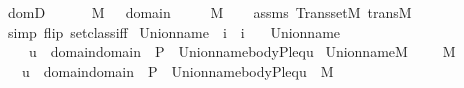 \begin{isabellebody}
%
\isadelimproof
\isanewline
%
\endisadelimproof
\isanewline
\isanewline
{}\isamarkupfalse%
\ domD\ {\isacharcolon}{\kern0pt}\isanewline
\ \ \ {\isachardoublequoteopen}{\isasymtau}\ {\isasymin}\ M{\isachardoublequoteclose}\ {\isachardoublequoteopen}{\isasymsigma}\ {\isasymin}\ domain{\isacharparenleft}{\kern0pt}{\isasymtau}{\isacharparenright}{\kern0pt}{\isachardoublequoteclose}\isanewline
\ \ \ {\isachardoublequoteopen}{\isasymsigma}\ {\isasymin}\ M{\isachardoublequoteclose}\isanewline
%
\isadelimproof
\ \ %
\endisadelimproof
%
\isatagproof
{}\isamarkupfalse%
\ assms\ Transset{\isacharunderscore}{\kern0pt}M\ trans{\isacharunderscore}{\kern0pt}M\isanewline
\ \ \isamarkupfalse%
\ {\isacharparenleft}{\kern0pt}simp\ flip{\isacharcolon}{\kern0pt}\ setclass{\isacharunderscore}{\kern0pt}iff{\isacharparenright}{\kern0pt}%
\endisatagproof
{\isafoldproof}%
%
\isadelimproof
\isanewline
%
\endisadelimproof
\isanewline
\isanewline
{}\isamarkupfalse%
\ Union{\isacharunderscore}{\kern0pt}name\ {\isacharcolon}{\kern0pt}{\isacharcolon}{\kern0pt}\ {\isachardoublequoteopen}i\ {\isasymRightarrow}\ i{\isachardoublequoteclose}\ \isanewline
\ \ {\isachardoublequoteopen}Union{\isacharunderscore}{\kern0pt}name{\isacharparenleft}{\kern0pt}{\isasymtau}{\isacharparenright}{\kern0pt}\ {\isasymequiv}\isanewline
\ \ \ \ {\isacharbraceleft}{\kern0pt}u\ {\isasymin}\ domain{\isacharparenleft}{\kern0pt}{\isasymUnion}{\isacharparenleft}{\kern0pt}domain{\isacharparenleft}{\kern0pt}{\isasymtau}{\isacharparenright}{\kern0pt}{\isacharparenright}{\kern0pt}{\isacharparenright}{\kern0pt}\ {\isasymtimes}\ P\ {\isachardot}{\kern0pt}\ Union{\isacharunderscore}{\kern0pt}name{\isacharunderscore}{\kern0pt}body{\isacharparenleft}{\kern0pt}P{\isacharcomma}{\kern0pt}leq{\isacharcomma}{\kern0pt}{\isasymtau}{\isacharcomma}{\kern0pt}u{\isacharparenright}{\kern0pt}{\isacharbraceright}{\kern0pt}{\isachardoublequoteclose}\isanewline
\isanewline
{}\isamarkupfalse%
\ Union{\isacharunderscore}{\kern0pt}name{\isacharunderscore}{\kern0pt}M\ {\isacharcolon}{\kern0pt}\ \ {\isachardoublequoteopen}{\isasymtau}\ {\isasymin}\ M{\isachardoublequoteclose}\isanewline
\ \ \ {\isachardoublequoteopen}{\isacharbraceleft}{\kern0pt}u\ {\isasymin}\ domain{\isacharparenleft}{\kern0pt}{\isasymUnion}{\isacharparenleft}{\kern0pt}domain{\isacharparenleft}{\kern0pt}{\isasymtau}{\isacharparenright}{\kern0pt}{\isacharparenright}{\kern0pt}{\isacharparenright}{\kern0pt}\ {\isasymtimes}\ P\ {\isachardot}{\kern0pt}\ Union{\isacharunderscore}{\kern0pt}name{\isacharunderscore}{\kern0pt}body{\isacharparenleft}{\kern0pt}P{\isacharcomma}{\kern0pt}leq{\isacharcomma}{\kern0pt}{\isasymtau}{\isacharcomma}{\kern0pt}u{\isacharparenright}{\kern0pt}{\isacharbraceright}{\kern0pt}\ {\isasymin}\ M{\isachardoublequoteclose}\isanewline

\end{isabellebody}

